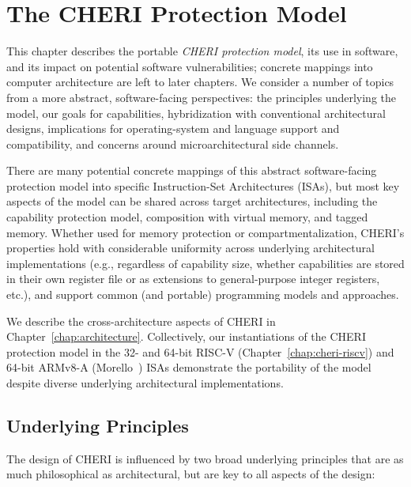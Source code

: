 \chapter{The CHERI Protection Model}
\label{chap:model}

This chapter describes the portable \textit{CHERI protection model}, its use
in software, and its impact on potential software vulnerabilities; concrete
mappings into computer architecture are left to later chapters.
We consider a number of topics from a more abstract, software-facing
perspectives: the principles underlying the model, our goals for capabilities,
hybridization with conventional architectural designs, implications for
operating-system and language support and compatibility, and concerns around
microarchitectural side channels.

There are many potential concrete mappings of this abstract software-facing
protection model into specific Instruction-Set Architectures (ISAs), but most
key aspects of the model can be shared across target architectures, including
the capability protection model, composition with virtual memory, and tagged
memory.
Whether used for memory protection or compartmentalization, CHERI's properties
hold with considerable uniformity across underlying architectural
implementations (e.g., regardless of capability size, whether capabilities are
stored in their own register file or as extensions to general-purpose integer
registers, etc.), and support common (and portable) programming
models and approaches.

We describe the cross-architecture aspects of CHERI in
Chapter~\ref{chap:architecture}.
Collectively, our instantiations of the CHERI protection model in the
32- and 64-bit RISC-V
(Chapter~\ref{chap:cheri-riscv}) and 64-bit ARMv8-A
(Morello~\cite{arm-morello}) ISAs
demonstrate the portability of the model despite diverse underlying
architectural implementations.

\section{Underlying Principles}

The design of CHERI is influenced by two broad underlying principles that are
as much philosophical as architectural, but are key to all aspects of the
design:

